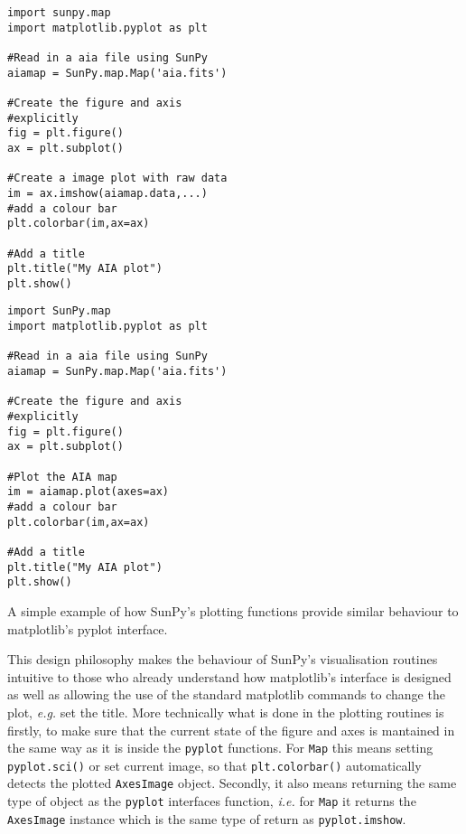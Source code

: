 \begin{listing}[H]
\begin{minipage}{0.49\columnwidth}
\begin{verbatim}
import sunpy.map
import matplotlib.pyplot as plt

#Read in a aia file using SunPy
aiamap = SunPy.map.Map('aia.fits')

#Create the figure and axis 
#explicitly
fig = plt.figure()
ax = plt.subplot()

#Create a image plot with raw data
im = ax.imshow(aiamap.data,...)
#add a colour bar
plt.colorbar(im,ax=ax)

#Add a title
plt.title("My AIA plot")
plt.show()
\end{verbatim}
\end{minipage}
\begin{minipage}{0.49\columnwidth}
\begin{verbatim}
import SunPy.map
import matplotlib.pyplot as plt

#Read in a aia file using SunPy
aiamap = SunPy.map.Map('aia.fits')

#Create the figure and axis 
#explicitly
fig = plt.figure()
ax = plt.subplot()

#Plot the AIA map
im = aiamap.plot(axes=ax)
#add a colour bar
plt.colorbar(im,ax=ax)

#Add a title
plt.title("My AIA plot")
plt.show()
\end{verbatim}
\end{minipage}
\caption{A simple example of how SunPy's plotting functions provide similar 
behaviour to matplotlib's pyplot interface.}
\label{code:mpl_1}
\end{listing}

This design philosophy makes the behaviour of SunPy's visualisation 
routines intuitive to those who already understand how matplotlib's 
interface is designed as well as allowing the use of the standard 
matplotlib commands to change the plot, \textit{e.g.} set the title. 
More technically what is done in the plotting routines is firstly, to 
make sure that the current state of the figure and axes is mantained 
in the same way as it is inside the \texttt{pyplot} functions. For 
\texttt{Map} this means setting \texttt{pyplot.sci()} or set current 
image, so that \texttt{plt.colorbar()} 
automatically detects the plotted \texttt{AxesImage} object. 
Secondly, it also means returning the same type of object as the 
\texttt{pyplot} interfaces function, \textit{i.e.} for \texttt{Map} 
it returns the \texttt{AxesImage} instance which is the same type of 
return as \texttt{pyplot.imshow}.
